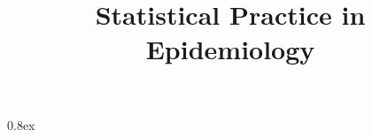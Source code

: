 \documentclass[12pt,dvipsnames,t,handout%
,aspectratio=169%
]{beamer}
\begin{document}
\parskip 0.8ex


\addtocounter{framenumber}{-1}

\title{Statistical Practice in Epidemiology}

\end{document}

